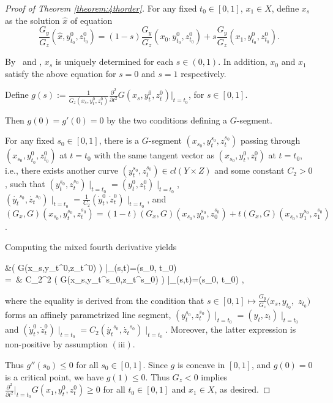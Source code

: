 \begin{proof}[Proof of Theorem \ref{theorem:4thorder}]
	For any fixed $t_0 \in [0,1]$, $x_1 \in X$, define $x_s$ as the solution $\hat{x}$ of equation
	\begin{equation*}
	\frac{G_y}{G_z}(\hat{x}, y_{t_0}^{0},z_{t_0}^{0}) = (1-s) \frac{G_y}{G_z}(x_0, y_{t_0}^{0},z_{t_0}^{0}) +s \frac{G_y}{G_z}(x_1, y_{t_0}^{0},z_{t_0}^{0}).
	\end{equation*}
	
	By \Gseven\ and \Geight, $x_s$ is uniquely determined for each $s\in (0,1)$. In addition, $x_0$ and $x_1$ satisfy the above equation for $s =0$ and $s=1$ respectively. 
	
	Define $g(s):=\frac{1}{G_z(x_s,y_t^{0},z_t^{0})}\frac{\partial^2}{\partial t^2}G(x_s, y_t^{0}, z_t^{0})\Big|_{t=t_0}$, for $s\in [0,1]$.
	
	Then $g(0) =g'(0)  =0 $ by the two conditions defining a $G$-segment. 
	
	
	For any fixed $s_0 \in [0,1]$, there is a $G$-segment $(x_{s_0}, y_t^{s_0}, z_t^{s_0})$ passing through $(x_{s_0}, y_{t_0}^{0}, z_{t_0}^{0})$ at $t=t_0$ with the same tangent vector as $(x_{s_0}, y_t^{0}, z_t^{0})$ at $t=t_0$, i.e., there exists 
	another curve $(y_t^{s_0}, z_t^{s_0}) \in cl( Y \times Z)$ and some constant $C_2>0$, such that $(y_t^{s_0},z_t^{s_0})\mid _{t=t_0} = (y_t^{0},z_t^{0})\mid _{t=t_0}$,  $(\dot{y_t}^{s_0},\dot{z_t}^{s_0})\mid _{t=t_0} = \frac{1}{C_2} (\dot{y}_t^{0},\dot{z}_t^{0})\mid _{t=t_0}  $, and $(G_x, G)(x_{s_0},y_t^{s_0},z_t^{s_0}) = (1-t)(G_x, G)(x_{s_0},y_0^{s_0},z_0^{s_0})+t (G_x, G)(x_{s_0},y_1^{s_0},z_1^{s_0})$. 
	
	Computing the mixed fourth derivative yields
	\begin{flalign*}
	&\Biggl( G(x_s,y_t^{0},z_t^{0}) \Biggr) \Bigg|_{(s,t)=(s_0, t_0)} \\
	=~& C_2^2	\Biggl( G(x_s,y_t^{s_0},z_t^{s_0}) \Biggr) \Bigg|_{(s,t)=(s_0, t_0)} ,
	\end{flalign*}
	where the equality is derived from the condition that $s \in [0,1] \longmapsto \frac{G_y}{G_z}(x_s, y_{t_0},$ $ z_{t_0})$ forms an affinely parametrized line segment,  $(y_t^{s_0},z_t^{s_0})\mid _{t=t_0} = (y_t,z_t)\mid _{t=t_0}$ and $ (\dot{y}_t^{0},\dot{z}_t^{0})\mid _{t=t_0} = C_2(\dot{y_t}^{s_0},\dot{z_t}^{s_0})\mid _{t=t_0} $. Moreover, the latter expression is non-positive by assumption $\mathrm{(iii)}$.
	
	Thus $g''(s_0)\le 0$ for all $s_0 \in [0,1]$. Since $g$ is concave in $[0,1]$, and $g(0)=0$ is a critical point, we have $g(1)\le 0$. Thus $G_z<0$ implies $\frac{\partial^2}{\partial t^2}\Big|_{t=t_0}G(x_1, y_t^{0}, z_t^{0}) \ge 0$ for all $t_0 \in [0,1]$ and $x_1 \in X$, as desired. 
\end{proof}


